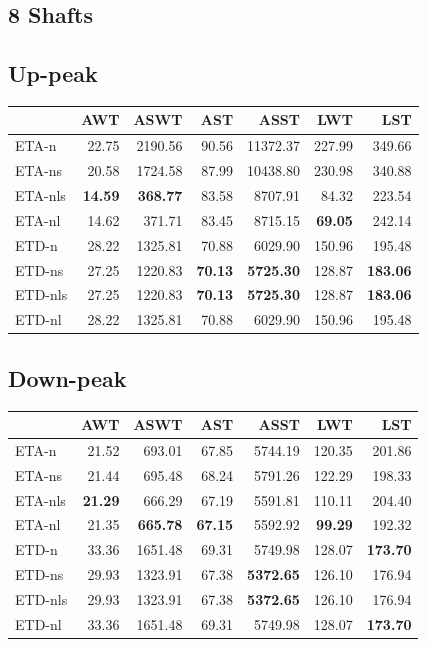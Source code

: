 \documentclass{UoYCSproject}
\begin{document}
\begin{appendices}
\section{8 Shafts}

\subsection{Up-peak}
\begin{tabular}{l | r r r r r r}
	& AWT & ASWT & AST & ASST & LWT & LST \\
	\hline
    ETA-n & 22.75 & 2190.56 & 90.56 & 11372.37 & 227.99 & 349.66 \\
    ETA-ns & 20.58 & 1724.58 & 87.99 & 10438.80 & 230.98 & 340.88 \\
    ETA-nls & \textbf{14.59} & \textbf{368.77} & 83.58 & 8707.91 & 84.32 & 223.54 \\
    ETA-nl & 14.62 & 371.71 & 83.45 & 8715.15 & \textbf{69.05} & 242.14 \\
    ETD-n & 28.22 & 1325.81 & 70.88 & 6029.90 & 150.96 & 195.48 \\
    ETD-ns & 27.25 & 1220.83 & \textbf{70.13} & \textbf{5725.30} & 128.87 & \textbf{183.06} \\
    ETD-nls & 27.25 & 1220.83 & \textbf{70.13} & \textbf{5725.30} & 128.87 & \textbf{183.06} \\
    ETD-nl & 28.22 & 1325.81 & 70.88 & 6029.90 & 150.96 & 195.48
\end{tabular}

\subsection{Down-peak}
\begin{tabular}{l | r r r r r r}
	& AWT & ASWT & AST & ASST & LWT & LST \\
	\hline
    ETA-n & 21.52 & 693.01 & 67.85 & 5744.19 & 120.35 & 201.86 \\
    ETA-ns & 21.44 & 695.48 & 68.24 & 5791.26 & 122.29 & 198.33 \\
    ETA-nls & \textbf{21.29} & 666.29 & 67.19 & 5591.81 & 110.11 & 204.40 \\
    ETA-nl & 21.35 & \textbf{665.78} & \textbf{67.15} & 5592.92 & \textbf{99.29} & 192.32 \\
    ETD-n & 33.36 & 1651.48 & 69.31 & 5749.98 & 128.07 & \textbf{173.70} \\
    ETD-ns & 29.93 & 1323.91 & 67.38 & \textbf{5372.65} & 126.10 & 176.94 \\
    ETD-nls & 29.93 & 1323.91 & 67.38 & \textbf{5372.65} & 126.10 & 176.94 \\
    ETD-nl & 33.36 & 1651.48 & 69.31 & 5749.98 & 128.07 & \textbf{173.70}
\end{tabular}


\end{appendices}
\end{document}

